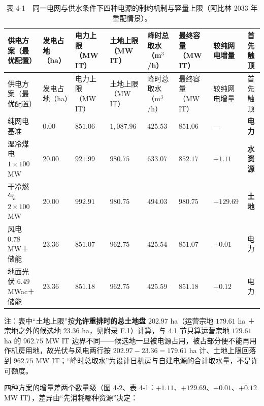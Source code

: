 {\small\setlength{\tabcolsep}{4pt}
\begin{longtable}{@{}p{}p{}p{}p{}p{}p{}p{}p{}@{}}
\caption{表 4-1　同一电网与供水条件下四种电源的制约机制与容量上限（阿比林 2033 年重配情景）。}
\label{tab:4-1}\\
\toprule
供电方案（最优配置） & 发电占地（ha） & 电力上限（MW IT） & 土地上限（MW IT） & 峰时总取水（m$^3$/h） & 最终容量（MW IT） & 较纯网电增量 & 首先触顶 \\
\midrule
\endfirsthead
\toprule
供电方案（最优配置） & 发电占地（ha） & 电力上限（MW IT） & 土地上限（MW IT） & 峰时总取水（m$^3$/h） & 最终容量（MW IT） & 较纯网电增量 & 首先触顶 \\
\midrule
\endhead
\bottomrule
\endlastfoot
纯网电基准 & $0.00$ & $851.06$ & $1{,}087.96$ & $425.53$ & $851.06$ & — & \textbf{电力} \\
湿冷煤电 $1\times100$ MW & $20.00$ & $921.99$ & $980.75$ & $633.07$ & $852.17$ & $+1.11$ & \textbf{水资源} \\
干冷燃气 $2\times100$ MW & $20.00$ & $992.91$ & $980.75$ & $494.03$ & $980.75$ & $+129.69$ & \textbf{土地} \\
风电 $0.78$ MW＋储能 & $23.36$ & $851.07$ & $962.75$ & $425.54$ & $851.07$ & $+0.01$ & 电力 \\
地面光伏 $6.49$ MWac＋储能 & $23.36$ & $851.18$ & $962.75$ & $425.59$ & $851.18$ & $+0.12$ & 电力 \\
\end{longtable}
}

{\footnotesize
\noindent 注：表中“土地上限”按\textbf{允许重排时的总土地盘} $202.97$ ha（运营宗地 $179.61$ ha ＋宗地之外的候选地 $23.36$ ha，见附录 F.1）计算，与 4.1 节只算运营宗地 $179.61$ ha 的 $962.75$ MW IT 边界不同——候选地一旦被电源占用，被占部分便不能再用作机房用地，故光伏与风电两行按 $202.97-23.36=179.61$ ha 计、土地上限回落到 $962.75$ MW IT；“峰时总取水”为设计日机房与自建电源的合计取水量，不是许可额度。
\par}

四种方案的增量差两个数量级（图 4-2、表 4-1：$+1.11$、$+129.69$、$+0.01$、$+0.12$ MW IT），差异由“先消耗哪种资源”决定：

